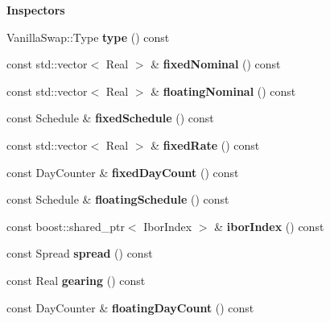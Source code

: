 \begin{Indent}{\bf Inspectors}\par
\begin{DoxyCompactItemize}
\item 
Vanilla\+Swap\+::\+Type {\bfseries type} () const \label{class_quant_lib_1_1_nonstandard_swap_a510c527312e41141ed1db2999352aa0f}

\item 
const std\+::vector$<$ Real $>$ \& {\bfseries fixed\+Nominal} () const \label{class_quant_lib_1_1_nonstandard_swap_af21ebac8f99fb636d49c9af14422f491}

\item 
const std\+::vector$<$ Real $>$ \& {\bfseries floating\+Nominal} () const \label{class_quant_lib_1_1_nonstandard_swap_a4bc2076ca11c108b81c6d23e3cb303cd}

\item 
const Schedule \& {\bfseries fixed\+Schedule} () const \label{class_quant_lib_1_1_nonstandard_swap_a8e143446b63386235c860ec594ae39c9}

\item 
const std\+::vector$<$ Real $>$ \& {\bfseries fixed\+Rate} () const \label{class_quant_lib_1_1_nonstandard_swap_a6b90dc7c37c9b45cc5662831e2dfc269}

\item 
const Day\+Counter \& {\bfseries fixed\+Day\+Count} () const \label{class_quant_lib_1_1_nonstandard_swap_a5867d482b89e9a1ed52e681baf0e6a17}

\item 
const Schedule \& {\bfseries floating\+Schedule} () const \label{class_quant_lib_1_1_nonstandard_swap_ae96c948b94f36649f9f69823254f1ae3}

\item 
const boost\+::shared\+\_\+ptr$<$ Ibor\+Index $>$ \& {\bfseries ibor\+Index} () const \label{class_quant_lib_1_1_nonstandard_swap_ae039038b1d796159b549bfe6ee4e8aac}

\item 
const Spread {\bfseries spread} () const \label{class_quant_lib_1_1_nonstandard_swap_a09c16467418d6f548cc1e0af5b528a99}

\item 
const Real {\bfseries gearing} () const \label{class_quant_lib_1_1_nonstandard_swap_a2779c9f9853184f83b0f466e76285bbe}

\item 
const Day\+Counter \& {\bfseries floating\+Day\+Count} () const \label{class_quant_lib_1_1_nonstandard_swap_a5c4496ff7d5d9a874e89066464c51c17}


\end{DoxyCompactItemize}
\end{Indent}
